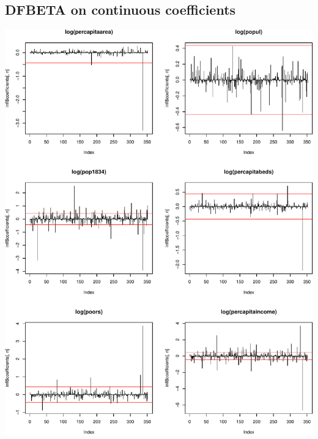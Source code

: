 \documentclass[]{article}
\begin{document}
\subsection{DFBETA on continuous
coefficients}\label{dfbeta-on-continuous-coefficients}

\includegraphics{project_files/figure-latex/unnamed-chunk-21-1.pdf}
\end{document}
